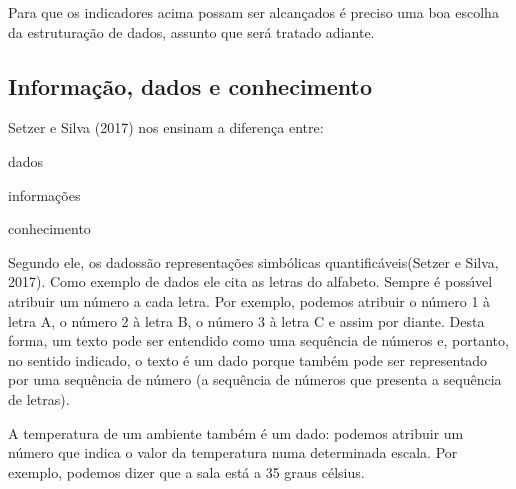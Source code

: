 \documentclass[
12pt,		%
openright,	%
twoside,  %
a4paper,			%
chapter=TITLE,		%
english,			%
french,				%
spanish,			%
brazil				%
]{USPSC-classe/USPSC_RedarTex}
\begin{document}
Para que os indicadores acima possam ser alcan\c{c}ados \'e preciso uma boa escolha da estrutura\c{c}\~ao de dados, assunto que ser\'a tratado adiante.










\subsection[Informa\c{c}\~ao, dados e conhecimento]{Informa\c{c}\~ao, dados e conhecimento}\label{Informa\c{c}\~ao, dados e conhecimento}
 Setzer e Silva (2017)  nos ensinam a diferen\c{c}a entre:











\begin{alineas}
\item dados
\item informa\c{c}\~oes
\item conhecimento
\end{alineas}

Segundo ele, os \textquotedbl dados\textquotedbl  s\~ao \textquotedbl representa\c{c}\~oes simb\'olicas quantific\'aveis\textquotedbl   (Setzer e Silva, 2017). Como exemplo de dados ele cita as letras do alfabeto. Sempre \'e poss\'{\i}vel atribuir um n\'umero a cada letra. Por exemplo, podemos atribuir o n\'umero 1 \`a letra A, o n\'umero 2 \`a letra B, o n\'umero 3 \`a letra C e assim por diante. Desta forma, um texto pode ser entendido como uma sequ\^encia de n\'umeros e, portanto, no sentido indicado, o texto \'e um dado porque tamb\'em pode ser representado por uma sequ\^encia de n\'umero (a sequ\^encia de n\'umeros que presenta a sequ\^encia de letras).










A temperatura de um ambiente tamb\'em \'e um dado: podemos atribuir um n\'umero que indica o valor da temperatura numa determinada escala. Por exemplo, podemos dizer que a sala \textquotedbl est\'a a 35 graus c\'elsius\textquotedbl .
\end{document}
